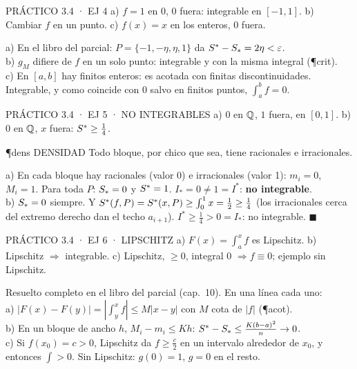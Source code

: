 \begin{enunciado}{PRÁCTICO 3.4 · EJ 4}
a) $f=1$ en 0, $0$ fuera: integrable en $[-1,1]$. b) Cambiar $f$ en un punto. c) $f(x)=x$ en los enteros, $0$ fuera.
\end{enunciado}
a) En el libro del parcial: $P=\{-1,-\eta,\eta,1\}$ da $S^{*}-S_{*}=2\eta<\varepsilon$.\\
b) $g_M$ difiere de $f$ en un solo punto: integrable y con la misma integral (\P{crit}).\\
c) En $[a,b]$ hay finitos enteros: es acotada con finitas discontinuidades. Integrable, y como coincide con 0 salvo en finitos puntos, $\int_a^bf=0$.

\begin{enunciado}{PRÁCTICO 3.4 · EJ 5 · NO INTEGRABLES}
a) $0$ en $\mathbb{Q}$, $1$ fuera, en $[0,1]$. b) $0$ en $\mathbb{Q}$, $x$ fuera: $S^{*}\ge\frac14$.
\end{enunciado}
\begin{uso}{\P{dens} DENSIDAD}
Todo bloque, por chico que sea, tiene racionales e irracionales.
\end{uso}
a) En cada bloque hay racionales (valor 0) e irracionales (valor 1): $m_i=0$, $M_i=1$. Para toda $P$: $S_{*}=0$ y $S^{*}=1$. $I_*=0\neq1=I^*$: \textbf{no integrable}.\\
b) $S_{*}=0$ siempre. Y $S^{*}(f,P)=S^{*}(x,P)\ge\int_0^1x=\frac12\ge\frac14$ (los irracionales cerca del extremo derecho dan el techo $a_{i+1}$). $I^*\ge\frac14>0=I_*$: no integrable. $\blacksquare$

\begin{enunciado}{PRÁCTICO 3.4 · EJ 6 · LIPSCHITZ}
a) $F(x)=\int_a^xf$ es Lipschitz. b) Lipschitz $\Rightarrow$ integrable. c) Lipschitz, $\ge0$, integral 0 $\Rightarrow f\equiv0$; ejemplo sin Lipschitz.
\end{enunciado}
Resuelto completo en el libro del parcial (cap.\ 10). En una línea cada uno:\\
a) $|F(x)-F(y)|=\left|\int_y^xf\right|\le M|x-y|$ con $M$ cota de $|f|$ (\P{acot}).\\
b) En un bloque de ancho $h$, $M_i-m_i\le Kh$: $S^{*}-S_{*}\le\frac{K(b-a)^2}n\to0$.\\
c) Si $f(x_0)=c>0$, Lipschitz da $f\ge\frac c2$ en un intervalo alrededor de $x_0$, y entonces $\int>0$. Sin Lipschitz: $g(0)=1$, $g=0$ en el resto.

